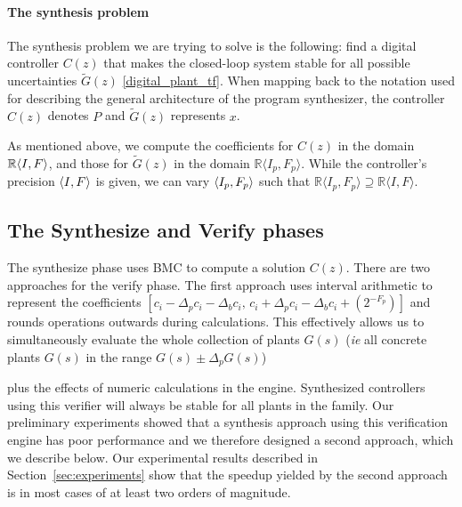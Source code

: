 \documentclass[final]{sig-alternate-05-2015}
\newcommand{\aabatecmt}[1]{}%
\begin{document}
\paragraph{The synthesis problem}
The synthesis problem we are trying to solve is the following:
find a digital controller $C(z)$ %
that makes the closed-loop system stable 
for all possible uncertainties 
$\tilde G(z)$ \eqref{digital_plant_tf}.
When mapping back to the notation used for describing the general architecture 
of the program synthesizer, the controller $C(z)$ denotes $P$ and 
$\tilde G(z)$ represents $x$. 

As mentioned above, we compute the coefficients for $C(z)$ 
in the domain $\mathbb{R}\langle{I},{F}\rangle$, 
and those for $\tilde G(z)$ in the domain
$\mathbb{R}\langle I_p,F_p \rangle$.
While the controller's precision $\langle{I},{F}\rangle$ is given, 
we can vary $\langle{I_p},{F_p}\rangle$ such that 
$\mathbb{R}\langle I_p,F_p \rangle \supseteq \mathbb{R}\langle I,F \rangle$.

\subsection{The {\sc Synthesize} and {\sc Verify} phases}

The {\sc synthesize} phase uses BMC to 
compute a solution $C(z)$. %
There are two approaches for the {\sc verify} phase.
The first approach uses interval arithmetic \cite{moore1966interval}
to represent the coefficients
$[{c}_i-\Delta_p{c}_i-\Delta_b{c}_i,\,\allowbreak
{c}_i+\Delta_p{c}_i-\Delta_b{c}_i+(2^{-F_p})]$ 
and rounds operations outwards during calculations.  This effectively allows
us to simultaneously evaluate the whole collection of plants $\hat{G}(s)$ (\emph{ie} all concrete plants $G(s)$ in the range $G(s) \pm \Delta_pG(s)$)
\aabatecmt{[unclear:] }
plus the effects of numeric calculations in the engine.  Synthesized
controllers using this verifier will always be stable for all plants in the
family.
Our preliminary experiments showed that a synthesis approach
using this verification engine has poor performance and we
therefore designed a second approach, which we describe below.
Our experimental results described in Section~\ref{sec:experiments}
show that the speedup yielded by the second approach 
is in most cases of at least two orders of magnitude. 
\end{document}
